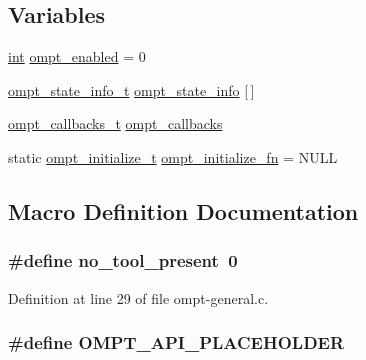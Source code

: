 \subsection*{Variables}
\begin{DoxyCompactItemize}
\item 
\hyperlink{ittnotify__static_8h_a8b8dcd723308a8cb5d84277c7a3fff70}{int} \hyperlink{ompt-general_8c_a966b31b6d05f79f5495f8d8e71732f68}{ompt\-\_\-enabled} = 0
\item 
\hyperlink{structompt__state__info__t}{ompt\-\_\-state\-\_\-info\-\_\-t} \hyperlink{ompt-general_8c_a65d0012802b770afefce726b4c18307d}{ompt\-\_\-state\-\_\-info} \mbox{[}$\,$\mbox{]}
\item 
\hyperlink{ompt-internal_8h_a7d8ca0a286bcf8192b571a8916082fa6}{ompt\-\_\-callbacks\-\_\-t} \hyperlink{ompt-general_8c_a84a29d89cef82c7c38e1ee1f70ec994f}{ompt\-\_\-callbacks}
\item 
static \hyperlink{ompt-general_8c_a47a896f6788d17f33e959156e0e4ffc0}{ompt\-\_\-initialize\-\_\-t} \hyperlink{ompt-general_8c_abffbd160d0e3b772a9252976be687844}{ompt\-\_\-initialize\-\_\-fn} = N\-U\-L\-L
\end{DoxyCompactItemize}


\subsection{Macro Definition Documentation}
\hypertarget{ompt-general_8c_a71d61df3b4829ca8af8c5b4a17fea5e4}{
\subsubsection[{no\-\_\-tool\-\_\-present}]{\setlength{\rightskip}{0pt plus 5cm}\#define no\-\_\-tool\-\_\-present~0}}\label{ompt-general_8c_a71d61df3b4829ca8af8c5b4a17fea5e4}


Definition at line 29 of file ompt-\/general.\-c.

\hypertarget{ompt-general_8c_a84497e99deb376a72994dee99fdd5dc6}{
\subsubsection[{O\-M\-P\-T\-\_\-\-A\-P\-I\-\_\-\-P\-L\-A\-C\-E\-H\-O\-L\-D\-E\-R}]{\setlength{\rightskip}{0pt plus 5cm}\#define O\-M\-P\-T\-\_\-\-A\-P\-I\-\_\-\-P\-L\-A\-C\-E\-H\-O\-L\-D\-E\-R}}\label{ompt-general_8c_a84497e99deb376a72994dee99fdd5dc6}


